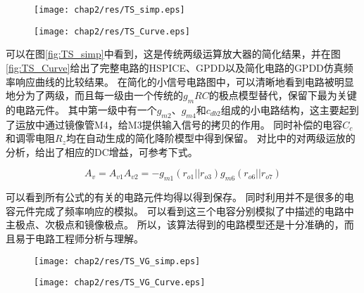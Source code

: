 \begin{figure}[!htp]
	\centering
	\texttt{[image: chap2/res/TS\_simp.eps]}
\end{figure}

\begin{figure}[!htp]
	\centering
	\texttt{[image: chap2/res/TS\_Curve.eps]}
\end{figure}

可以在图\ref{fig:TS_simp}中看到，这是传统两级运算放大器的简化结果，并在图\ref{fig:TS_Curve}给出了完整电路的HSPICE、GPDD以及简化电路的GPDD仿真频率响应曲线的比较结果。
在简化的小信号电路图中，可以清晰地看到电路被明显地分为了两级，而且每一级由一个传统的$g_m R C$的极点模型替代，保留下最为关键的电路元件。
其中第一级中有一个$g_{m2}$、$g_{m4}$和$c_{db2}$组成的小电路结构，这主要起到了运放中通过镜像管M4，给M3提供输入信号的拷贝的作用。
同时补偿的电容$C_c$和调零电阻$R_z$均在自动生成的简化降阶模型中得到保留。
对比\parencite{GRAY-Analog}中的对两级运放的分析，给出了相应的DC增益，可参考下式。

\begin{equation}
{A_v} = {A_{v1}}{A_{v2}} =  - {g_{m1}}\left( {{r_{o1}}||{r_{o3}}} \right){g_{m6}}\left( {{r_{o6}}||{r_{o7}}} \right)
\end{equation}

可以看到所有公式的有关的电路元件均得以得到保存。
同时利用并不是很多的电容元件完成了频率响应的模拟。
可以看到这三个电容分别模拟了\parencite{Allen-Analog}中描述的电路中主极点、次极点和镜像极点。
所以，该算法得到的电路模型还是十分准确的，而且易于电路工程师分析与理解。

\begin{figure}[!htp]
	\centering
	\texttt{[image: chap2/res/TS\_VG\_simp.eps]}
\end{figure}

\begin{figure}[!htp]
	\centering
	\texttt{[image: chap2/res/TS\_VG\_Curve.eps]}
\end{figure}

